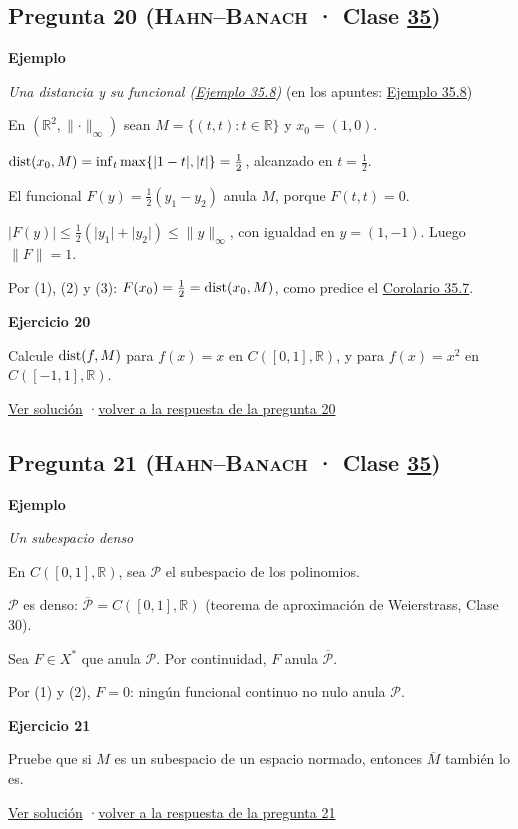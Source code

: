 \documentclass[11pt,a4paper]{article}
\newcommand{\R}{\mathbb{R}}\newcommand{\N}{\mathbb{N}}\newcommand{\Q}{\mathbb{Q}}
\newcommand{\cl}[1]{\overline{#1}}\newcommand{\norm}[1]{\lVert #1\rVert}\newcommand{\abs}[1]{\lvert #1\rvert}
\newcommand{\bloque}[1]{\par\smallskip\noindent\textbf{\color{acento}#1}\par}
\begin{document}
\subsection*{\hypertarget{e-20}{}Pregunta 20 \normalfont\small(\textsc{Hahn–Banach} · Clase \href{https://decostruttivismo.github.io/MAT2514-repaso/pdf/MAT2514_apuntes_completos.pdf\#nameddest=section.35}{35})}
\bloque{Ejemplo}
\textit{Una distancia y su funcional (\href{https://decostruttivismo.github.io/MAT2514-repaso/pdf/MAT2514_apuntes_completos.pdf\#nameddest=teorema.35.8}{Ejemplo 35.8})} {\small(en los apuntes: \href{https://decostruttivismo.github.io/MAT2514-repaso/pdf/MAT2514_apuntes_completos.pdf\#nameddest=teorema.35.8}{Ejemplo 35.8})}
\begin{pasos}
\item[] En $(\R^2,\norm\cdot_\infty)$ sean $M=\{(t,t):t\in\R\}$ y $x_0=(1,0)$.
\item[(1)] $\dist(x_0,M)=\inf_t\max\{\abs{1-t},\abs t\}=\frac12$, alcanzado en $t=\frac12$.
\item[(2)] El funcional $F(y)=\frac12(y_1-y_2)$ anula $M$, porque $F(t,t)=0$.
\item[(3)] $\abs{F(y)}\le\frac12(\abs{y_1}+\abs{y_2})\le\norm y_\infty$, con igualdad en $y=(1,-1)$. Luego $\norm F=1$.
\item[] Por (1), (2) y (3): $F(x_0)=\frac12=\operatorname{dist}(x_0,M)$, como predice el \href{https://decostruttivismo.github.io/MAT2514-repaso/pdf/MAT2514_apuntes_completos.pdf\#nameddest=teorema.35.7}{Corolario 35.7}.
\end{pasos}
\bloque{\hypertarget{x-20}{}Ejercicio 20}
Calcule $\operatorname{dist}(f,M)$ para $f(x)=x$ en $C([0,1],\R)$, y para $f(x)=x^2$ en $C([-1,1],\R)$.
\par{\small \hyperlink{s-20}{Ver solución} \quad·\quad \hyperlink{r-20}{volver a la respuesta de la pregunta 20}}
\subsection*{\hypertarget{e-21}{}Pregunta 21 \normalfont\small(\textsc{Hahn–Banach} · Clase \href{https://decostruttivismo.github.io/MAT2514-repaso/pdf/MAT2514_apuntes_completos.pdf\#nameddest=section.35}{35})}
\bloque{Ejemplo}
\textit{Un subespacio denso}
\begin{pasos}
\item[] En $C([0,1],\R)$, sea $\mathcal P$ el subespacio de los polinomios.
\item[(1)] $\mathcal P$ es denso: $\cl{\mathcal P}=C([0,1],\R)$ (teorema de aproximación de Weierstrass, Clase 30).
\item[(2)] Sea $F\in X^*$ que anula $\mathcal P$. Por continuidad, $F$ anula $\cl{\mathcal P}$.
\item[] Por (1) y (2), $F=0$: ningún funcional continuo no nulo anula $\mathcal P$.
\end{pasos}
\bloque{\hypertarget{x-21}{}Ejercicio 21}
Pruebe que si $M$ es un subespacio de un espacio normado, entonces $\cl M$ también lo es.
\par{\small \hyperlink{s-21}{Ver solución} \quad·\quad \hyperlink{r-21}{volver a la respuesta de la pregunta 21}}
\end{document}
